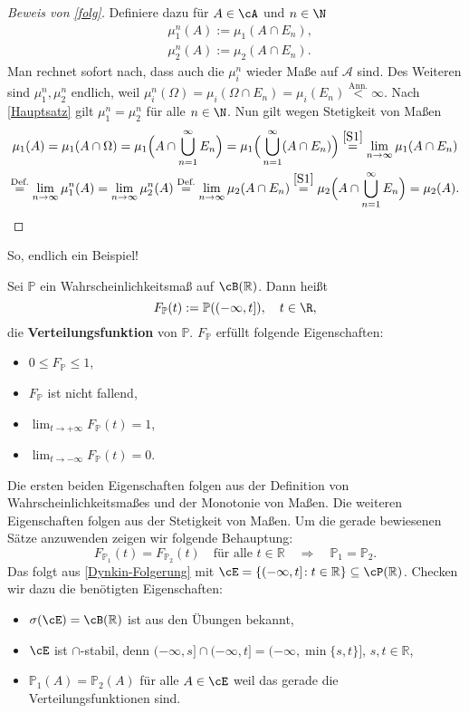\begin{proof}[Beweis von \ref{folg}]
Definiere dazu für $A \in \cA$ und $n \in \N$
	\begin{align*}
	&\mu_1^{n}(A) := \mu_1(A\cap E_n),\\
	&\mu_2^{n}(A) := \mu_2(A\cap E_n).
	\end{align*}
	Man rechnet sofort nach, dass auch die $\mu_i^n$ wieder Ma\ss e auf $\mathcal A$ sind. Des Weiteren sind $\mu_1^{n}, \mu_2^{n}$ endlich, weil $\mu_i^{n} (\Omega) = \mu_i(\Omega \cap E_n) = \mu_i(E_n) \overset{\text{Ann.}}{<} \infty$. Nach \ref{Hauptsatz} gilt $\mu_1^{n} = \mu_2^{n}$ für alle $n \in \N$. Nun gilt wegen Stetigkeit von Ma\ss en
	\begin{gather*}
	\mu_1(A) = \mu_1(A \cap \Omega) = \mu_1\Big(A \cap \bigcup\limits_{n=1}^{\infty} E_n\Big) = \mu_1\Big(\bigcup\limits_{n=1}^{\infty} (A\cap E_n)\Big) \overset{\ref{S1}}{=} \lim\limits_{n \to \infty} \mu_1(A\cap E_n) \\ 
	\overset{\text{Def.}}{=} \lim\limits_{n \to \infty} \mu^n_1(A) = \lim\limits_{n \to \infty} \mu^n_2(A) \overset{\text{Def.}}{=}  \lim\limits_{n \to \infty} \mu_2(A\cap E_n) \overset{\ref{S1}}{=} \mu_2\Big(A \cap \bigcup\limits_{n=1}^{\infty} E_n\Big) = \mu_2(A).
	\end{gather*}
\end{proof}
So, endlich ein Beispiel!
\begin{beispiel}
	Sei $\mathbb P$ ein Wahrscheinlichkeitsma\ss{} auf $\cB(\mathbb{R})$. Dann heißt $$F_{\mathbb{P}}(t) := \mathbb{P}((-\infty,t]), \quad t\in \R, $$die \textbf{Verteilungsfunktion} von $\mathbb{P}$. $F_{\mathbb{P}}$ erfüllt folgende Eigenschaften:
	\begin{itemize}
		\item $0 \leq F_{\mathbb{P}} \leq 1$,
		\item $F_{\mathbb{P}}$ ist nicht fallend,
		\item $\lim_{t\to +\infty} F_{\mathbb P}(t)=1$,
		\item $\lim_{t\to -\infty} F_{\mathbb P}(t)=0$.
	\end{itemize}
	Die ersten beiden Eigenschaften folgen aus der Definition von Wahrscheinlichkeitsma\ss es und der Monotonie von Ma\ss en. Die weiteren Eigenschaften folgen aus der Stetigkeit von Ma\ss en. Um die gerade bewiesenen S\"atze anzuwenden zeigen wir folgende Behauptung: $$F_{\mathbb{P}_1}(t) = F_{\mathbb{P}_2}(t) \quad \text{f\"ur alle } t\in \mathbb{R}\quad \Longrightarrow \quad\mathbb{P}_1 = \mathbb{P}_2.$$ Das folgt aus \ref{Dynkin-Folgerung} mit $\cE = \{ (-\infty,t] \! : t\in \mathbb{R} \} \subseteq \cP(\mathbb{R})$. Checken wir dazu die ben\"otigten Eigenschaften:
	\begin{itemize}
		\item $\sigma(\cE) = \cB(\mathbb{R})$ ist aus den \"Ubungen bekannt,
		\item $\cE$ ist $\cap$-stabil, denn $(-\infty,s] \cap (-\infty,t] = (-\infty, \min\{ s,t \}]$, $s,t \in \mathbb{R}$,
		\item $\mathbb{P}_1(A) = \mathbb{P}_2(A)$ f\"ur alle $A \in \cE$ weil das gerade die Verteilungsfunktionen sind.
	\end{itemize}
\end{beispiel}
